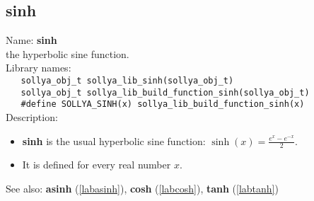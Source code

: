 \subsection{sinh}
\label{labsinh}
\noindent Name: \textbf{sinh}\\
\phantom{aaa}the hyperbolic sine function.\\[0.2cm]
\noindent Library names:\\
\verb|   sollya_obj_t sollya_lib_sinh(sollya_obj_t)|\\
\verb|   sollya_obj_t sollya_lib_build_function_sinh(sollya_obj_t)|\\
\verb|   #define SOLLYA_SINH(x) sollya_lib_build_function_sinh(x)|\\[0.2cm]
\noindent Description: \begin{itemize}

\item \textbf{sinh} is the usual hyperbolic sine function: $\sinh(x) = \frac{e^x - e^{-x}}{2}$.

\item It is defined for every real number $x$.
\end{itemize}
See also: \textbf{asinh} (\ref{labasinh}), \textbf{cosh} (\ref{labcosh}), \textbf{tanh} (\ref{labtanh})
